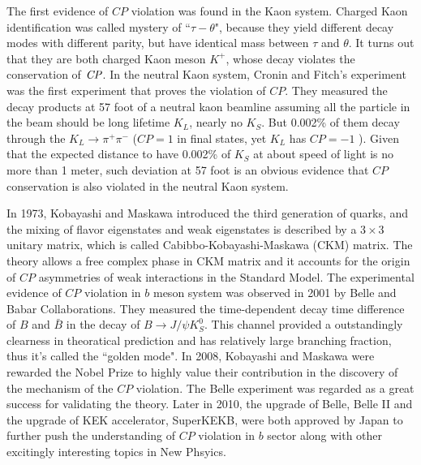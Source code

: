 The first evidence of $CP$ violation was found in the Kaon system. Charged Kaon identification was called mystery of ``$\tau - \theta$", because they yield different decay modes with different parity, but have identical mass between $\tau$ and $\theta$. It turns out that they are both charged Kaon meson $K^{+}$, whose decay violates the conservation of $\it{CP}$. In the neutral Kaon system, Cronin and Fitch's experiment was the first experiment that proves the violation of $CP$. They measured the decay products at 57 foot of a neutral kaon beamline assuming all the particle in the beam should be long lifetime $K_L$, nearly no $K_S$. But 0.002\% of them decay through the $K_L \to \pi^+ \pi^-$ ($CP=1$ in final states, yet $K_L$ has  $CP=-1$ ). Given that the expected distance to have 0.002\% of $K_S$ at about speed of light is no more than 1 meter, such deviation at 57 foot is an obvious evidence that $CP$ conservation is also violated in the neutral Kaon system.

In 1973, Kobayashi and Maskawa introduced the third generation of quarks, and the mixing of flavor eigenstates and weak eigenstates is described by a $3\times3$ unitary matrix, which is called Cabibbo-Kobayashi-Maskawa (CKM) matrix\cite{CKM}. The theory allows a free complex phase in CKM matrix and it accounts for the origin of $CP$ asymmetries of weak interactions in the Standard Model. The experimental evidence of $CP$ violation in $b$ meson system was observed in 2001 by Belle and Babar Collaborations. They measured the time-dependent decay time difference of $B$ and $\bar{B}$ in the decay of $B\to J/\psi K_S^0$. This channel provided a outstandingly clearness in theoratical prediction and has relatively large branching fraction, thus it's called the ``golden mode". In 2008, Kobayashi and Maskawa were rewarded the Nobel Prize to highly value their contribution in the discovery of the mechanism of the $CP$ violation. The Belle experiment was regarded as a great success for validating the theory. Later in 2010, the upgrade of Belle, Belle II and the upgrade of KEK accelerator, SuperKEKB, were both approved by Japan to further push the understanding of $CP$ violation in $b$ sector along with other excitingly interesting topics in New Phsyics. 

